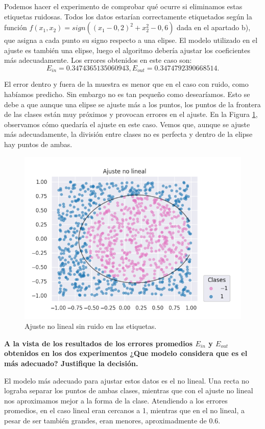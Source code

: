 \documentclass[a4paper, 20pt]{article}
\begin{document}
Podemos hacer el experimento de comprobar qué ocurre si eliminamos estas etiquetas ruidosas. Todos los datos estarían correctamente etiquetados según la función $f(x_1, x_2) = sign((x_1 - 0,2)^2 + x_2^2 - 0,6)$ dada en el apartado b), que asigna a cada punto su signo respecto a una elipse. El modelo utilizado en el ajuste es también una elipse, luego el algoritmo debería ajustar los coeficientes más adecuadamente. Los errores obtenidos en este caso son:\[
E_{in} = 0.3474365135060943,
E_{out} = 0.3474792390668514.\]

El error dentro y fuera de la muestra es menor que en el caso con ruido, como habíamos predicho. Sin embargo no es tan pequeño como desearíamos. Esto se debe a que aunque una elipse se ajuste más a los puntos, los puntos de la frontera de las clases están muy próximos y provocan errores en el ajuste. En la Figura \ref{fig:nonoise}, observamos cómo quedaría el ajuste en este caso. Vemos que, aunque se ajuste más adecuadamente, la división entre clases no es perfecta y dentro de la elipse hay puntos de ambas.

\begin{figure}[H]
    \centering
    \includegraphics[width=1\textwidth]{nonoise}
    \caption{Ajuste no lineal sin ruido en las etiquetas.}
    \label{fig:nonoise}
\end{figure}

\textbf{A la vista de los resultados de los errores promedios $E_{in}$ y $E_{out}$ obtenidos en los dos experimentos ¿Que modelo considera que es el más adecuado? Justifique la decisión.}

El modelo más adecuado para ajustar estos datos es el no lineal. Una recta no lograba separar los puntos de ambas clases, mientras que con el ajuste no lineal nos aproximamos mejor a la forma de la clase. Atendiendo a los errores promedios, en el caso lineal eran cercanos a 1, mientras que en el no lineal, a pesar de ser también grandes, eran menores, aproximadmente de 0.6. 
\end{document}
